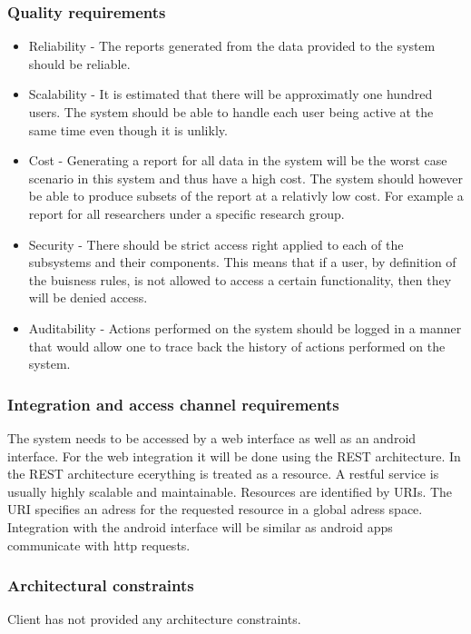 \documentclass{article}
\begin{document}
			\subsubsection{Quality requirements}
				\begin{itemize}
				  \item Reliability - The reports generated from the data provided to the system should be reliable.
				  \item Scalability - It is estimated that there will be approximatly one hundred users. The system should be able to handle each user being active at the same time even though it is unlikly.
				  \item Cost - Generating a report for all data in the system will be the worst case scenario in this system and thus have a high cost. The system should however be able to produce subsets of the report at a relativly low cost. For example a report for all researchers under a specific research group.
				  \item Security - There should be strict access right applied to each of the subsystems and their components. This means that if a user, by definition of the buisness rules, is not allowed to access a certain functionality, then they will be denied access.
				  \item Auditability - Actions performed on the system should be logged in a manner that would allow one to trace back the history of actions performed on the system.
				\end{itemize}

			\subsubsection{Integration and access channel requirements}
				The system needs to be accessed by a web interface as well as an android interface.
				For the web integration it will be done using the REST architecture. In the REST architecture ecerything is treated as a resource. A restful service is usually highly scalable and maintainable. Resources are identified by URIs. The URI specifies an adress for the requested resource in a global adress space. Integration with the android interface will be similar as android apps communicate with http requests.

			\subsubsection{Architectural constraints}
				Client has not provided any architecture constraints.
		
\end{document}
